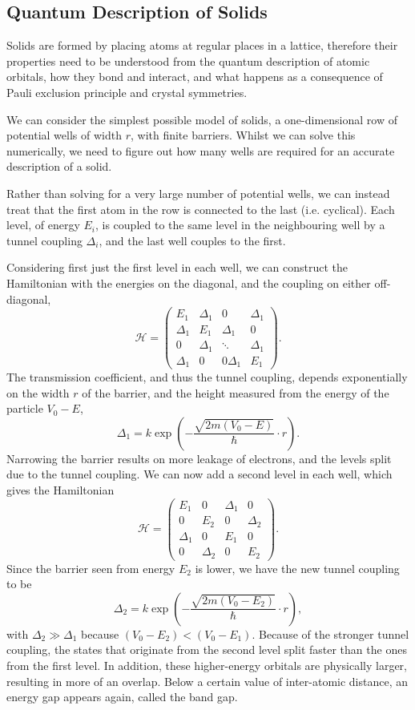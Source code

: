 \documentclass{article}
\begin{document}
\subsection{Quantum Description of Solids}
Solids are formed by placing atoms at regular places in a lattice, therefore their properties need to be understood from the quantum description of atomic orbitals, how they bond and interact, and what happens as a consequence of Pauli exclusion principle and crystal symmetries.

We can consider the simplest possible model of solids, a one-dimensional row of potential wells of width $r$, with finite barriers. Whilst we can solve this numerically, we need to figure out how many wells are required for an accurate description of a solid.

Rather than solving for a very large number of potential wells, we can instead treat that the first atom in the row is connected to the last (i.e. cyclical). Each level, of energy $E_i$, is coupled to the same level in the neighbouring well by a tunnel coupling $\Delta _i$, and the last well couples to the first.

Considering first just the first level in each well, we can construct the Hamiltonian with the energies on the diagonal, and the coupling on either off-diagonal, 
\[
    \mathcal{H}=\begin{pmatrix}
        E_1&\Delta_{1}&0&\Delta _1\\
        \Delta _1&E_1&\Delta _1&0\\
        0&\Delta _1&\ddots&\Delta _1\\
        \Delta _1&0&0\Delta _1&E_1
    \end{pmatrix}.
\]
The transmission coefficient, and thus the tunnel coupling, depends exponentially on the width $r$ of the barrier, and the height measured from the energy of the particle $V_0-E$, 
\[
    \Delta _1=k \exp \left( -\frac{\sqrt{2m \left( V_0-E \right)}}{\hbar }\cdot r \right).
\]
Narrowing the barrier results on more leakage of electrons, and the levels split due to the tunnel coupling. We can now add a second level in each well, which gives the Hamiltonian 
\[
    \mathcal{H}=\begin{pmatrix}
        E_1&0&\Delta _1&0\\
        0&E_2&0&\Delta _2\\
        \Delta _1&0&E_1&0\\
        0&\Delta _2&0&E_2
    \end{pmatrix}.
\]
Since the barrier seen from energy $E_2$ is lower, we have the new tunnel coupling to be 
\[
    \Delta _2=k \exp \left( -\frac{\sqrt{2m \left( V_0-E_2 \right)}}{\hbar }\cdot r \right),
\]
with $\Delta _2\gg\Delta _1$ because $\left( V_0-E_2 \right)< \left( V_0-E_1 \right)$. Because of the stronger tunnel coupling, the states that originate from the second level split faster than the ones from the first level. In addition, these higher-energy orbitals are physically larger, resulting in more of an overlap. Below a certain value of inter-atomic distance, an energy gap appears again, called the band gap.
\end{document}
